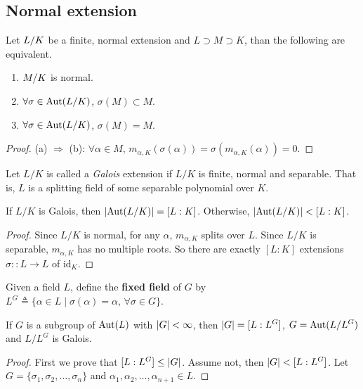 \subsection{Normal extension}

\begin{prop}
  Let ${L}/{K}$ be a finite, normal extension and $L \supset M \supset K$, than the following
  are equivalent.

  \begin{enumerate}[(\alph*)]
    \item ${M}/{K}$ is normal.
    \item $\forall \sigma \in \operatorname{Aut}({L}/{K})$, $\sigma(M) \subset M$.
    \item $\forall \sigma \in \operatorname{Aut}({L}/{K})$, $\sigma(M) = M$.
  \end{enumerate}

  \begin{proof}
    (a) $\Rightarrow$ (b): $\forall \alpha \in M$, $m_{\alpha, K}(\sigma(\alpha)) = \sigma(m_{\alpha, K}(\alpha)) = 0$.
  \end{proof}
\end{prop}

\begin{definition}
  Let $L/K$ is called a \emph{Galois} extension if $L/K$ is finite, normal and separable.
  That is, $L$ is a splitting field of some separable polynomial over $K$.
\end{definition}

\begin{theorem}
  If $L/K$ is Galois, then $\lvert\operatorname{Aut}(L/K)\rvert = [L:K]$. Otherwise, $\lvert\operatorname{Aut}(L/K)\rvert < [L:K]$.

  \begin{proof}
    Since $L/K$ is normal, for any $\alpha$, $m_{\alpha, K}$ splits over $L$.
    Since $L/K$ is separable, $m_{\alpha, K}$ has no multiple roots. So there are exactly $[L:K]$
    extensions $\sigma:: L \to L$ of $\text{id}_K$.
  \end{proof}
\end{theorem}

\begin{definition}
  Given a field $L$, define the {\bf fixed field} of $G$ by
  $L^G \triangleq \{ \alpha \in L \mid \sigma(\alpha) = \alpha, \, \forall \sigma \in G \}$.
\end{definition}

\begin{theorem}
  If $G$ is a subgroup of $\operatorname{Aut}(L)$ with $\lvert G\rvert < \infty$, then $\lvert G\rvert = [L: L^G]$, $G = \operatorname{Aut}(L / L^G)$
  and $L / L^G$ is Galois.

  \begin{proof}
    First we prove that $[L: L^G] \leq \lvert G\rvert$. Assume not, then $\lvert G\rvert < [L: L^G]$.
    Let $G = \{\sigma_1, \sigma_2, \dots, \sigma_n\}$ and $\alpha_1, \alpha_2, \dots, \alpha_{n+1} \in L$.
  \end{proof}
\end{theorem}

